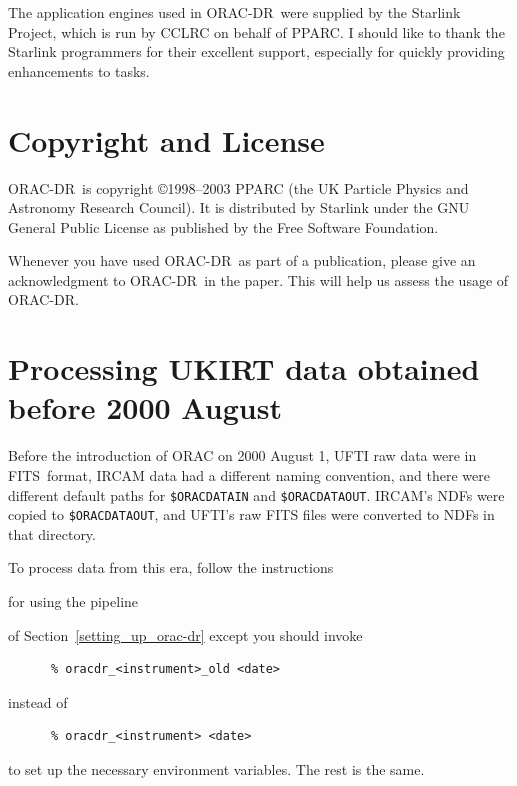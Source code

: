 \documentclass[twoside,11pt]{article}
\newcommand{\htmladdnormallink}[2]{#1}
\newcommand{\htmlref}[2]{#1}
\newenvironment{latexonly}{}{}
\newcommand{\xlabel}[1]{}
\renewcommand{\_}{\texttt{\symbol{95}}}
\newcommand{\ORACDR}{{\footnotesize ORAC-DR}}
\newcommand{\FITSref}{\htmladdnormallink{FITS}{http://fits.gsfc.nasa.gov/}}
\begin{document}
The application engines used in \ORACDR\ were supplied by the Starlink
Project, which is run by CCLRC on behalf of PPARC.  I should like to
thank the Starlink programmers for their excellent support, especially
for quickly providing enhancements to tasks.

\section{Copyright and License}

\ORACDR\ is copyright \copyright 1998--2003 PPARC (the UK Particle Physics
and Astronomy Research Council).  It is distributed by Starlink
under the GNU General Public License as published by the Free Software
Foundation.

Whenever you have used \ORACDR\ as part of a publication, please give
an acknowledgment to \ORACDR\ in the paper.  This will help us assess
the usage of \ORACDR.

\newpage
\appendix
\section{\xlabel{processing__ukirt_data_obtained_before_2000_august}Processing
UKIRT data obtained before 2000 August\label{
processing_ukirt_data_obtained_before_2000_august}}%

Before the introduction of
\htmladdnormallink{ORAC}{http://www.stsci.edu/stsci/meetings/adassVII/bridgera.html}
on 2000 August 1, UFTI raw data were in \FITSref\ format, IRCAM data had a
different naming convention, and there were different default paths for
{\tt\$ORAC\_DATA\_IN} and {\tt\$ORAC\_DATA\_OUT}.  IRCAM's NDFs were
copied to {\tt \$ORAC\_DATA\_OUT}, and UFTI's raw FITS files were
converted to NDFs in that directory.

To process data from this era, follow the instructions 
\begin{htmlonly}
\htmlref{for using the pipeline}{setting_up_orac-dr}
\end{htmlonly}
\begin{latexonly}
of Section~\ref{setting_up_orac-dr}
\end{latexonly}
except you should invoke 
\begin{verbatim}
      % oracdr_<instrument>_old <date>
\end{verbatim}
instead of
\begin{verbatim}
      % oracdr_<instrument> <date>
\end{verbatim}
to set up the necessary environment variables.  The rest is the same.
\end{document}

